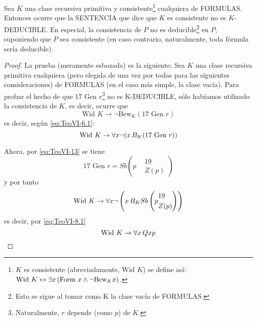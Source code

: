 \begin{teorema} \label{teo:TeoremaXI}
    Sea $K$ una clase recursiva primitiva y consistente\footnote{$K$ es consistente (abreviadamente, $\text{Wid } K$) se define así: 
    $\text{Wid } K \leftrightarrow \exists x \thinspace (\text{Form } x \wedge \lnot \text{Bew}_K x)$.} cualquiera de FORMULAS. Entonces ocurre que la SENTENCIA que dice que $K$ es 
    consistente no es $K$-DEDUCIBLE. En especial, la consistencia de $P$ no es deducible\footnote{Esto se sigue al tomar como K la clase vacía de FORMULAS.} en $P$, suponiendo que $P$ sea
    consistente (en caso contrario, naturalmente, toda fórmula sería deducible).
\end{teorema}
\begin{proof}
    La prueba (meramente esbozada) es la siguiente: Sea $K$ una clase recursiva primitiva cualquiera (pero elegida de una vez por todas para las siguientes consideraciones) de FORMULAS 
    (en el caso más simple, la clase vacía). Para probar el hecho de que $17 \text{ Gen } r$\footnote{Naturalmente, $r$ depende (como $p$) de $K$.} no es K-DEDUCIBLE, sólo habíamos utilizado 
    la consistencia de $K$, es decir, ocurre que
    \begin{equation} \label{eq:teoXI-23}
        \text{Wid } K \rightarrow \lnot \text{Bew}_K (17 \text{ Gen } r)
    \end{equation}
    es decir, según \eqref{eq:TeoVI-6.1}:
    \begin{equation}
        \text{Wid } K \rightarrow \forall x \lnot (x \thinspace B_K (17 \text{ Gen } r))
    \end{equation}

    Ahora, por \eqref{eq:TeoVI-13} se tiene 
    \begin{equation}
        17 \text{ Gen } r = Sb\left(p
        \begin{aligned}
            &19 \\
            &Z(p)
        \end{aligned}
        \right)
    \end{equation}
    y por tanto
    \begin{equation}
        \text{Wid } K \rightarrow \forall x \lnot \left(x \thinspace B_K Sb\left(p
        \begin{aligned}
            &19 \\
            &Z(p)
        \end{aligned}
        \right)\right)
    \end{equation}
    es decir, por \eqref{eq:TeoVI-8.1}
    \begin{equation} \label{eq:teoXI-24}
        \text{Wid } K \rightarrow \forall x \thinspace Qxp
    \end{equation}


\end{proof}

